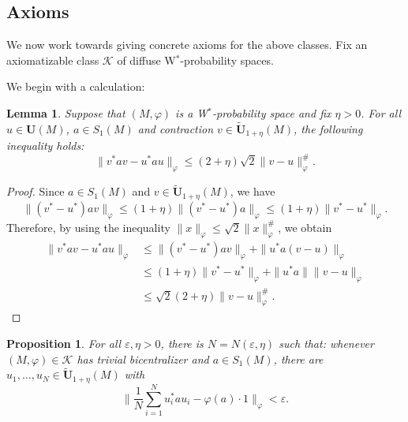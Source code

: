 \documentclass[12pt]{amsart}
\newtheorem{lem}[thm]{Lemma}
\newtheorem{prop}[thm]{Proposition}
\theoremstyle{definition}
\newcommand{\ep}{\varepsilon}
\def\cal{\mathcal}
\begin{document}
\subsection{Axioms}

We now work towards giving concrete axioms for the above classes.  Fix an axiomatizable class $\cal K$ of diffuse W$^*$-probability spaces.

We begin with a calculation:

\begin{lem}\label{lem v*av-u*au}
Suppose that $(M,\varphi)$ is a W$^*$-probability space and fix $\eta>0$. For all $u\in \mathbf{U}(M)$, $a\in S_1(M)$ and contraction $v\in \tilde{\mathbf{U}}_{1+\eta}(M)$, the following inequality holds:
\begin{equation*}
\|v^*av-u^*au\|_{\varphi}\le (2+\eta)\sqrt{2}\|v-u\|_{\varphi}^{\#}.
\end{equation*}
\end{lem}
\begin{proof}
    Since $a\in S_1(M)$ and $v\in \tilde{\mathbf{U}}_{1+\eta}(M)$, we have 
    \[\|(v^*-u^*)av\|_{\varphi}\le (1+\eta)\|(v^*-u^*)a\|_{\varphi}\le (1+\eta)\|v^*-u^*\|_{\varphi}.\]
    Therefore, by using the inequality $\|x\|_{\varphi}\le \sqrt{2}\|x\|_{\varphi}^{\#}$, we obtain
    \begin{align*}
        \|v^*av-u^*au\|_{\varphi}&\le \|(v^*-u^*)av\|_{\varphi}+\|u^*a(v-u)\|_{\varphi}\\
        &\le (1+\eta)\|v^*-u^*\|_{\varphi}+\|u^*a\|\|v-u\|_{\varphi}\\
        &\le \sqrt{2}(2+\eta)\|v-u\|_{\varphi}^{\#}.
    \end{align*}
\end{proof}

\begin{prop}\label{boundonconvex}
For all $\ep,\eta>0$, there is $N=N(\ep,\eta)$ such that:  whenever $(M,\varphi)\in \cal K$ has trivial bicentralizer and $a\in S_1(M)$, there are $u_1,\ldots,u_N\in \tilde{\mathbf{U}}_{1+\eta}(M)$ with \begin{equation}\|\frac{1}{N}\sum_{i=1}^N u_i^*au_i-\varphi(a)\cdot 1\|_\varphi<\ep.\label{eq N combinations of u*au}
\end{equation}
\end{prop}
\end{document}
